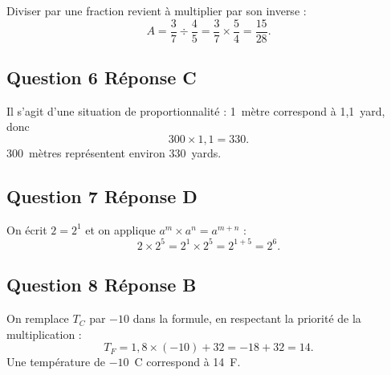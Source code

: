\documentclass[10pt]{article}
\begin{document}
Diviser par une fraction revient à multiplier par son inverse :
\[A = \dfrac{3}{7} \div \dfrac{4}{5} = \dfrac{3}{7} \times \dfrac{5}{4} = \dfrac{15}{28}.\]

\subsection*{Question 6 \quad Réponse C}

Il s'agit d'une situation de proportionnalité : 1~mètre correspond à 1,1~yard, donc
\[300 \times 1,1 = 330.\]
300~mètres représentent environ 330~yards.

\subsection*{Question 7 \quad Réponse D}

On écrit $2 = 2^1$ et on applique $a^m \times a^n = a^{m+n}$ :
\[2 \times 2^5 = 2^1 \times 2^5 = 2^{1+5} = 2^6.\]

\subsection*{Question 8 \quad Réponse B}

On remplace $T_C$ par $-10$ dans la formule, en respectant la priorité de la
multiplication :
\[T_F = 1,8 \times (-10) + 32 = -18 + 32 = 14.\]
Une température de $-10$~\textdegree C correspond à 14~\textdegree F.
\end{document}

